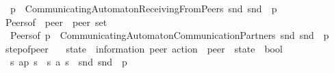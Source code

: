 \begin{isabellebody}
\ \ {\isachardoublequoteopen}{\isasymP}\isactrlsub {\isacharquery}{\kern0pt}{\isacharparenleft}{\kern0pt}p{\isacharparenright}{\kern0pt}\ {\isasymequiv}\ CommunicatingAutomaton{\isachardot}{\kern0pt}ReceivingFromPeers\ {\isacharparenleft}{\kern0pt}snd\ {\isacharparenleft}{\kern0pt}snd\ {\isacharparenleft}{\kern0pt}{\isasymA}\ p{\isacharparenright}{\kern0pt}{\isacharparenright}{\kern0pt}{\isacharparenright}{\kern0pt}{\isachardoublequoteclose}\isanewline
\isanewline
{}\isamarkupfalse%
\ Peers{\isacharunderscore}{\kern0pt}of\ {\isacharcolon}{\kern0pt}{\isacharcolon}{\kern0pt}\ {\isachardoublequoteopen}{\isacharprime}{\kern0pt}peer\ {\isasymRightarrow}\ {\isacharprime}{\kern0pt}peer\ set{\isachardoublequoteclose}\ \isanewline
\ \ {\isachardoublequoteopen}Peers{\isacharunderscore}{\kern0pt}of\ p\ {\isasymequiv}\ CommunicatingAutomaton{\isachardot}{\kern0pt}CommunicationPartners\ {\isacharparenleft}{\kern0pt}snd\ {\isacharparenleft}{\kern0pt}snd\ {\isacharparenleft}{\kern0pt}{\isasymA}\ p{\isacharparenright}{\kern0pt}{\isacharparenright}{\kern0pt}{\isacharparenright}{\kern0pt}{\isachardoublequoteclose}\isanewline
\isanewline
{}\isamarkupfalse%
\ step{\isacharunderscore}{\kern0pt}of{\isacharunderscore}{\kern0pt}peer\isanewline
\ \ {\isacharcolon}{\kern0pt}{\isacharcolon}{\kern0pt}\ {\isachardoublequoteopen}{\isacharprime}{\kern0pt}state\ {\isasymRightarrow}\ {\isacharparenleft}{\kern0pt}{\isacharprime}{\kern0pt}information{\isacharcomma}{\kern0pt}\ {\isacharprime}{\kern0pt}peer{\isacharparenright}{\kern0pt}\ action\ {\isasymRightarrow}\ {\isacharprime}{\kern0pt}peer\ {\isasymRightarrow}\ {\isacharprime}{\kern0pt}state\ {\isasymRightarrow}\ bool{\isachardoublequoteclose}\isanewline
\ \ {\isacharparenleft}{\kern0pt}{\isachardoublequoteopen}{\isacharunderscore}{\kern0pt}\ {\isasymmidarrow}{\isacharunderscore}{\kern0pt}{\isasymrightarrow}\isactrlsub {\isasymC}{\isacharunderscore}{\kern0pt}\ {\isacharunderscore}{\kern0pt}{\isachardoublequoteclose}\ {\isacharbrackleft}{\kern0pt}{}{}{\isacharcomma}{\kern0pt}\ {}{}{\isacharcomma}{\kern0pt}\ {}{}{\isacharcomma}{\kern0pt}\ {}{}{\isacharbrackright}{\kern0pt}\ {}{}{}{\isacharparenright}{\kern0pt}\ \isanewline
\ \ {\isachardoublequoteopen}s{}\ {\isasymmidarrow}a{\isasymrightarrow}\isactrlsub {\isasymC}p\ s{}\ {\isasymequiv}\ {\isacharparenleft}{\kern0pt}s{}{\isacharcomma}{\kern0pt}\ a{\isacharcomma}{\kern0pt}\ s{}{\isacharparenright}{\kern0pt}\ {\isasymin}\ snd\ {\isacharparenleft}{\kern0pt}snd\ {\isacharparenleft}{\kern0pt}{\isasymA}\ p{\isacharparenright}{\kern0pt}{\isacharparenright}{\kern0pt}{\isachardoublequoteclose}\isanewline

\end{isabellebody}
